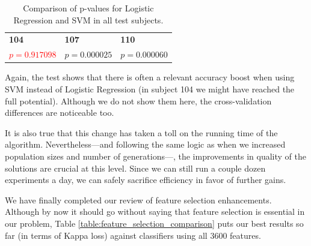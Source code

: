 \newpage

     \begin{table}[h]

        \centering
        \setlength\arrayrulewidth{0.8pt}

        \begin{tabular}{| >{\centering\arraybackslash}m{0.9in} |  >{\centering\arraybackslash}m{0.9in} | >{\centering\arraybackslash}m{0.9in} |}

        	\hline
        	\rowcolor{RoyalBlue}
        	\multicolumn{3}{| >{\centering\arraybackslash}m{3.054in} |}{\textbf{Logistic Regression against SVM}} \\
            \hline
            \rowcolor{RoyalBlue}
            \textbf{104} & \textbf{107} & \textbf{110} \\
            \hline
            \textcolor{red}{$p = 0.917098$} & $p = 0.000025$ & $p = 0.000060$ \\
            \hline

        \end{tabular}

        \caption{Comparison of p-values for Logistic Regression and \acs{SVM} in all test subjects.}\label{table:models_kruskal}

    \end{table}

    Again, the test shows that there is often a relevant accuracy boost when using \acs{SVM} instead of Logistic Regression (in subject 104 we might have reached the full potential). Although we do not show them here, the cross-validation differences are noticeable too.

    It is also true that this change has taken a toll on the running time of the algorithm. Nevertheless---and following the same logic as when we increased population sizes and number of generations---, the improvements in quality of the solutions are crucial at this level. Since we can still run a couple dozen experiments a day, we can safely sacrifice efficiency in favor of further gains.

	We have finally completed our review of feature selection enhancements. Although by now it should go without saying that feature selection is essential in our problem, Table \ref{table:feature_selection_comparison} puts our best results so far (in terms of Kappa loss) against classifiers using all 3600 features.

	\vspace{0.3cm}

